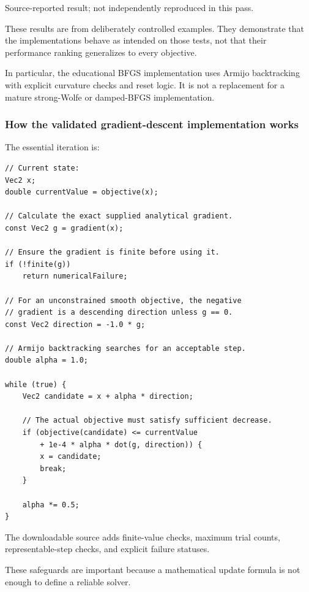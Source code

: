 Source-reported result; not independently reproduced in this pass.

These results are from deliberately controlled examples. They demonstrate that the implementations behave as intended on those tests, not that their performance ranking generalizes to every objective.

In particular, the educational BFGS implementation uses Armijo backtracking with explicit curvature checks and reset logic. It is not a replacement for a mature strong-Wolfe or damped-BFGS implementation.

\subsubsection{How the validated gradient-descent implementation works}\label{02-foundations-ii-ch028-how-the-validated-gradient-descent-implementation-works}

\hypertarget{02-foundations-ii-ch028-how-the-validated-gradient-descent-implementation-works}{}

The essential iteration is:

\begin{verbatim}
// Current state:
Vec2 x;
double currentValue = objective(x);

// Calculate the exact supplied analytical gradient.
const Vec2 g = gradient(x);

// Ensure the gradient is finite before using it.
if (!finite(g))
    return numericalFailure;

// For an unconstrained smooth objective, the negative
// gradient is a descending direction unless g == 0.
const Vec2 direction = -1.0 * g;

// Armijo backtracking searches for an acceptable step.
double alpha = 1.0;

while (true) {
    Vec2 candidate = x + alpha * direction;

    // The actual objective must satisfy sufficient decrease.
    if (objective(candidate) <= currentValue
        + 1e-4 * alpha * dot(g, direction)) {
        x = candidate;
        break;
    }

    alpha *= 0.5;
}
\end{verbatim}

The downloadable source adds finite-value checks, maximum trial counts, representable-step checks, and explicit failure statuses.

These safeguards are important because a mathematical update formula is not enough to define a reliable solver.

